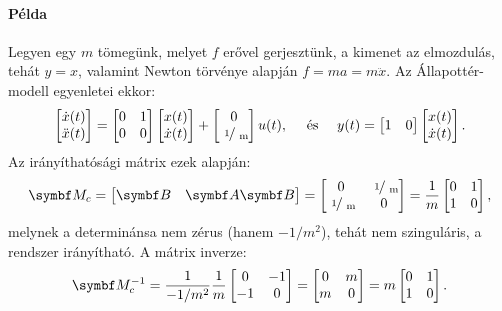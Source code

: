 \paragraph{Példa} Legyen egy $m$ tömegünk, melyet $f$ erővel gerjesztünk, a
kimenet az elmozdulás, tehát $y = x$, valamint Newton törvénye alapján
$f = ma = m \ddot x$. Az Állapottér-modell egyenletei ekkor:
\begin{equation}
  \begin{bmatrix}
    \dot x(t) \\ \ddot x(t)
  \end{bmatrix} = \begin{bmatrix}
    0 & 1 \\ 0 & 0
  \end{bmatrix} \begin{bmatrix}
    x(t) \\ \dot x(t)
  \end{bmatrix} + \begin{bmatrix}
    0 \\ \slashfrac{1}{m}
  \end{bmatrix} u(t),
  \quad \text{ és } \quad
  y(t) = \begin{bmatrix}
    1 & 0
  \end{bmatrix} \begin{bmatrix}
    x(t) \\ \dot x(t)
  \end{bmatrix}.
\end{equation}
Az irányíthatósági mátrix ezek alapján:
\begin{equation}
  \rmat M_c = \begin{bmatrix}
    \rmat B & \rmat A \rmat B
  \end{bmatrix} = \begin{bmatrix}
    0                & \slashfrac{1}{m} \\
    \slashfrac{1}{m} & 0
  \end{bmatrix} = \frac{1}{m} \begin{bmatrix}
    0 & 1 \\ 1 & 0
  \end{bmatrix},
\end{equation}
melynek a determinánsa nem zérus (hanem $-1/m^2$), tehát nem szinguláris,
a rendszer irányítható. A mátrix inverze:
\begin{equation}
  \rmat M_c^{-1} = \frac{1}{-1/m^2} \frac{1}{m} \begin{bmatrix}
    0 & -1 \\ -1 & 0
  \end{bmatrix} = \begin{bmatrix}
    0 & m \\ m & 0
  \end{bmatrix} = m \begin{bmatrix}
    0 & 1 \\ 1 & 0
  \end{bmatrix}.
\end{equation}
